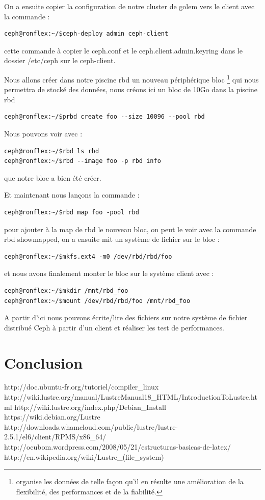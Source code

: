 \documentclass[12pt]{article}
\begin{document}
On a ensuite copier la configuration de notre cluster de golem vers le client avec la commande : 
\begin{verbatim}
ceph@ronflex:~/$ceph-deploy admin ceph-client
\end{verbatim}

cette commande à copier le ceph.conf et le ceph.client.admin.keyring dans le dossier /etc/ceph sur le ceph-client.

Nous allons créer dans notre piscine rbd un nouveau périphérique bloc \footnote{organise les données de telle façon qu'il en résulte une amélioration de la flexibilité, des performances et de la fiabilité.} qui nous permettra de stocké des données, nous créons ici un bloc de 10Go dans la piscine rbd
\begin{verbatim}
ceph@ronflex:~/$prbd create foo --size 10096 --pool rbd
\end{verbatim}

Nous pouvons voir avec : 
\begin{verbatim}
ceph@ronflex:~/$rbd ls rbd 
ceph@ronflex:~/$rbd --image foo -p rbd info 
\end{verbatim}

que notre bloc a bien été créer.

Et maintenant nous lançons la commande :
\begin{verbatim}
ceph@ronflex:~/$rbd map foo -pool rbd
\end{verbatim}

pour ajouter à la map de rbd le nouveau bloc, on peut le voir avec la commande rbd showmapped, on a ensuite mit un système de fichier sur le bloc :
\begin{verbatim}
ceph@ronflex:~/$mkfs.ext4 -m0 /dev/rbd/rbd/foo
\end{verbatim}

et nous avons finalement monter le bloc sur le système client avec :
\begin{verbatim}
ceph@ronflex:~/$mkdir /mnt/rbd_foo
ceph@ronflex:~/$mount /dev/rbd/rbd/foo /mnt/rbd_foo
\end{verbatim}

A partir d'ici nous pouvons écrite/lire des fichiers sur notre système de fichier distribué Ceph à partir d'un client et réaliser les test de performances.
\section{Conclusion}


http://doc.ubuntu-fr.org/tutoriel/compiler\_linux 
http://wiki.lustre.org/manual/LustreManual18\_HTML/IntroductionToLustre.html
http://wiki.lustre.org/index.php/Debian\_Install
https://wiki.debian.org/Lustre
http://downloads.whamcloud.com/public/lustre/lustre-2.5.1/el6/client/RPMS/x86\_64/
http://ocubom.wordpress.com/2008/05/21/estructuras-basicas-de-latex/
http://en.wikipedia.org/wiki/Lustre\_(file\_system)
\end{document}
